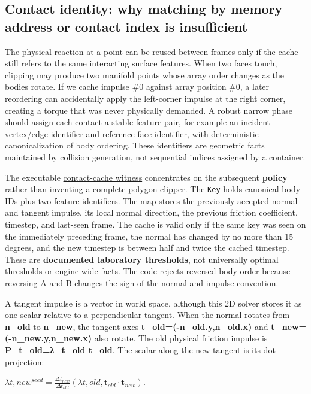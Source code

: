 \subsection{Contact identity: why matching by memory address or contact index is insufficient}\label{appendix-c9d92e145503-contact-identity-why-matching-by-memory-address-or-contact-index-is-insufficient}

The physical reaction at a point can be reused between frames only if the cache still refers to the same interacting surface features. When two faces touch, clipping may produce two manifold points whose array order changes as the bodies rotate. If we cache impulse \#0 against array position \#0, a later reordering can accidentally apply the left-corner impulse at the right corner, creating a torque that was never physically demanded. A robust narrow phase should assign each contact a stable feature pair, for example an incident vertex/edge identifier and reference face identifier, with deterministic canonicalization of body ordering. These identifiers are geometric facts maintained by collision generation, not sequential indices assigned by a container.

The executable \hyperref[source-file-830b13449e1c6505af693753]{contact-cache witness} concentrates on the subsequent \textbf{policy} rather than inventing a complete polygon clipper. The \texttt{Key} holds canonical body IDs plus two feature identifiers. The map stores the previously accepted normal and tangent impulse, its local normal direction, the previous friction coefficient, timestep, and last-seen frame. The cache is valid only if the same key was seen on the immediately preceding frame, the normal has changed by no more than 15 degrees, and the new timestep is between half and twice the cached timestep. These are \textbf{documented laboratory thresholds}, not universally optimal thresholds or engine-wide facts. The code rejects reversed body order because reversing A and B changes the sign of the normal and impulse convention.

A tangent impulse is a vector in world space, although this 2D solver stores it as one scalar relative to a perpendicular tangent. When the normal rotates from \textbf{n\_old} to \textbf{n\_new}, the tangent axes \textbf{t\_old=(-n\_old.y,n\_old.x)} and \textbf{t\_new=(-n\_new.y,n\_new.x)} also rotate. The old physical friction impulse is \textbf{P\_t\_old=λ\_t\_old t\_old}. The scalar along the new tangent is its dot projection:

\(\lambda{t,new}^{seed} = \frac{\Delta t_{new}}{\Delta t_{old}} \left(\lambda{t,old},\mathbf t_{old}\cdot\mathbf t_{new}\right).\)

